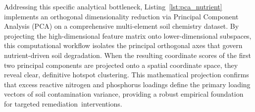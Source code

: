 \documentclass[environremediat,article,accept,pdftex,oneauthor]{Definitions/mdpi}
\begin{document}
Addressing this specific analytical bottleneck, Listing~\ref{lst:pca_nutrient} implements an orthogonal dimensionality reduction via Principal Component Analysis (PCA) on a comprehensive multi-element soil chemistry dataset. By projecting the high-dimensional feature matrix onto lower-dimensional subspaces, this computational workflow isolates the principal orthogonal axes that govern nutrient-driven soil degradation. When the resulting coordinate scores of the first two principal components are projected onto a spatial coordinate space, they reveal clear, definitive hotspot clustering. This mathematical projection confirms that excess reactive nitrogen and phosphorus loadings define the primary loading vectors of soil contamination variance, providing a robust empirical foundation for targeted \mbox{remediation interventions.}
\end{document}
